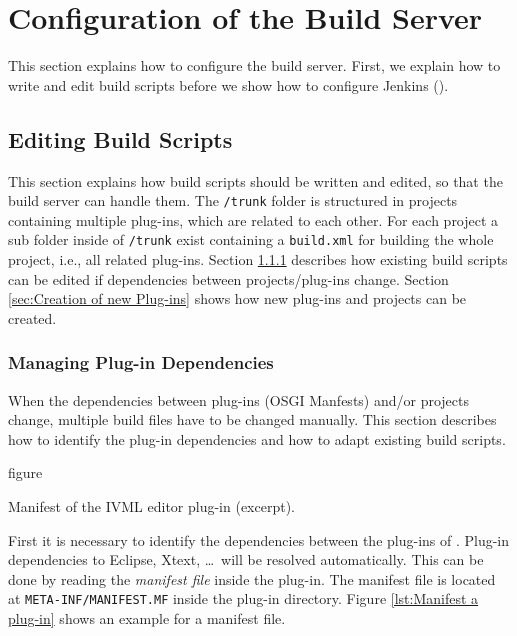 \section{Configuration of the Build Server}
\label{sec:BuildServer}
This section explains how to configure the build server. First, we explain how to write and edit build scripts before we show how to configure Jenkins (\Jenkins).

\subsection{Editing Build Scripts}
\label{sec:Editing Build Scripts}
This section explains how build scripts should be written and edited, so that the build server can handle them. The \texttt{/trunk} folder is structured in projects containing multiple plug-ins, which are related to each other. For each project a sub folder inside of \texttt{/trunk} exist containing a \texttt{build.xml} for building the whole project, i.e., all related plug-ins. Section \ref{sec:Managing Plug-in Dependencies} describes how existing build scripts can be edited if dependencies between projects/plug-ins change. Section \ref{sec:Creation of new Plug-ins} shows how new plug-ins and projects can be created.

\subsubsection{Managing Plug-in Dependencies}
\label{sec:Managing Plug-in Dependencies}
When the dependencies between plug-ins (OSGI Manfests) and/or projects change, multiple build files have to be changed manually. This section describes how to identify the plug-in dependencies and how to adapt existing build scripts.

\begin{nofloat}{figure}
	\centering
	
	\caption[Manifest of the IVML editor]{Manifest of the IVML editor plug-in (excerpt).}
	\label{lst:Manifest a plug-in}
\end{nofloat}

First it is necessary to identify the dependencies between the plug-ins of \EASy. Plug-in dependencies to Eclipse, Xtext, \ldots\ will be resolved automatically. This can be done by reading the \textit{manifest file} inside the plug-in. The manifest file is located at \texttt{META-INF/MANIFEST.MF} inside the plug-in directory. Figure \vref{lst:Manifest a plug-in} shows an example for a manifest file.

